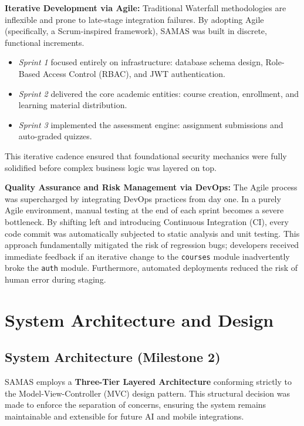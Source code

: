 \documentclass[12pt, a4paper]{report}
\begin{document}
\textbf{Iterative Development via Agile:}
Traditional Waterfall methodologies are inflexible and prone to late-stage integration failures. By adopting Agile (specifically, a Scrum-inspired framework), SAMAS was built in discrete, functional increments.
\begin{itemize}[noitemsep]
    \item \textit{Sprint 1} focused entirely on infrastructure: database schema design, Role-Based Access Control (RBAC), and JWT authentication.
    \item \textit{Sprint 2} delivered the core academic entities: course creation, enrollment, and learning material distribution.
    \item \textit{Sprint 3} implemented the assessment engine: assignment submissions and auto-graded quizzes.
\end{itemize}
This iterative cadence ensured that foundational security mechanics were fully solidified before complex business logic was layered on top.

\textbf{Quality Assurance and Risk Management via DevOps:}
The Agile process was supercharged by integrating DevOps practices from day one. In a purely Agile environment, manual testing at the end of each sprint becomes a severe bottleneck. By shifting left and introducing Continuous Integration (CI), every code commit was automatically subjected to static analysis and unit testing. This approach fundamentally mitigated the risk of regression bugs; developers received immediate feedback if an iterative change to the \texttt{courses} module inadvertently broke the \texttt{auth} module. Furthermore, automated deployments reduced the risk of human error during staging.

\chapter{System Architecture and Design}

\section{System Architecture (Milestone 2)}
SAMAS employs a \textbf{Three-Tier Layered Architecture} conforming strictly to the Model-View-Controller (MVC) design pattern. This structural decision was made to enforce the separation of concerns, ensuring the system remains maintainable and extensible for future AI and mobile integrations.
\end{document}
